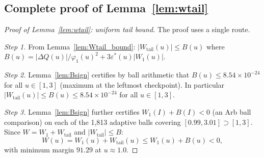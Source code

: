 \documentclass[11pt]{article}
\theoremstyle{definition}
\theoremstyle{remark}
\begin{document}
\subsection{Complete proof of Lemma~\ref{lem:wtail}}

\begin{proof}[Proof of Lemma~\ref{lem:wtail}: uniform tail bound]
The proof uses a single route.

\emph{Step 1.} From Lemma~\ref{lem:Wtail_bound}:
$|W_{\mathrm{tail}}(u)| \leq B(u)$
where $B(u) = |\Delta Q(u)|/\varphi_1(u)^2 + 3\varepsilon^*(u)|W_1(u)|$.

\emph{Step 2.} Lemma~\ref{lem:Bsign} certifies by ball arithmetic that
$B(u) \leq 8.54\times 10^{-24}$ for all $u\in[1,3]$
(maximum at the leftmost checkpoint).
In particular $|W_{\mathrm{tail}}(u)| \leq B(u) \leq 8.54\times 10^{-24}$ for all $u\in[1,3]$.

\emph{Step 3.} Lemma~\ref{lem:Bsign} further certifies
$W_1(I)+B(I) < 0$ (an Arb ball comparison)
on each of the 1{,}813 adaptive balls covering $[0.99,3.01]\supset[1,3]$.
Since $W = W_1 + W_{\mathrm{tail}}$ and $|W_{\mathrm{tail}}| \leq B$:
\[
W(u) = W_1(u) + W_{\mathrm{tail}}(u) \leq W_1(u) + B(u) < 0,
\]
with minimum margin $91.29$ at $u\approx1.0$.
\end{proof}
\end{document}
